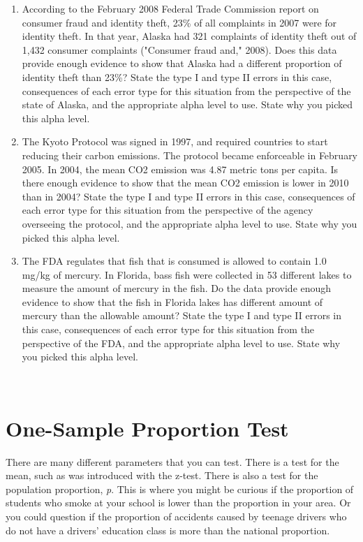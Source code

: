 \documentclass[
]{book}
\begin{document}
\begin{enumerate}
\item
  According to the February 2008 Federal Trade Commission report on consumer fraud and identity theft, 23\% of all complaints in 2007 were for identity theft. In that year, Alaska had 321 complaints of identity theft out of 1,432 consumer complaints ("Consumer fraud and," 2008). Does this data provide enough evidence to show that Alaska had a different proportion of identity theft than 23\%? State the type I and type II errors in this case, consequences of each error type for this situation from the perspective of the state of Alaska, and the appropriate alpha level to use. State why you picked this alpha level.
\item
  The Kyoto Protocol was signed in 1997, and required countries to start reducing their carbon emissions. The protocol became enforceable in February 2005. In 2004, the mean CO2 emission was 4.87 metric tons per capita. Is there enough evidence to show that the mean CO2 emission is lower in 2010 than in 2004? State the type I and type II errors in this case, consequences of each error type for this situation from the perspective of the agency overseeing the protocol, and the appropriate alpha level to use. State why you picked this alpha level.
\item
  The FDA regulates that fish that is consumed is allowed to contain 1.0 mg/kg of mercury. In Florida, bass fish were collected in 53 different lakes to measure the amount of mercury in the fish. Do the data provide enough evidence to show that the fish in Florida lakes has different amount of mercury than the allowable amount? State the type I and type II errors in this case, consequences of each error type for this situation from the perspective of the FDA, and the appropriate alpha level to use. State why you picked this alpha level.
\end{enumerate}

\textbf{\\
}

\hypertarget{one-sample-proportion-test}{%
\section{One-Sample Proportion Test}\label{one-sample-proportion-test}}

There are many different parameters that you can test. There is a test for the mean, such as was introduced with the z-test. There is also a test for the population proportion, \emph{p}. This is where you might be curious if the proportion of students who smoke at your school is lower than the proportion in your area. Or you could question if the proportion of accidents caused by teenage drivers who do not have a drivers' education class is more than the national proportion.
\end{document}
